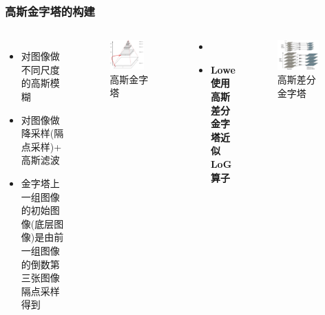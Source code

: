 \documentclass[presentation,aspectratio=1610]{beamer}
\begin{document}
\begin{frame}
	\frametitle{高斯金字塔的构建}
	\begin{columns}
		\footnotesize
		\begin{itemize}
			\item 对图像做不同尺度的高斯模糊
			\item 对图像做降采样(隔点采样)+ 高斯滤波
			\item 金字塔上一组图像的初始图像(底层图像)是由前一组图像的倒数第三张图像隔点采样得到
		\end{itemize}
		
		\begin{figure}[htbp!]
			\centering
			\includegraphics[width=0.8\textwidth]{img/jinzi.jpg}
			\caption{高斯金字塔}
		\end{figure}	\pause
		\begin{itemize}
			\item {\color{red}{ 尺度规范化的LoG算子具有真正的尺度不变性 }}
			\item \textbf{ Lowe使用高斯差分金字塔近似LoG算子}
		\end{itemize}
		
		\begin{figure}[htbp!]
			\centering
			\includegraphics[width=0.9\textwidth]{img/chafen.jpg}
			\caption{高斯差分金字塔}
		\end{figure}
		
	\end{columns}
\end{frame}
\end{document}
